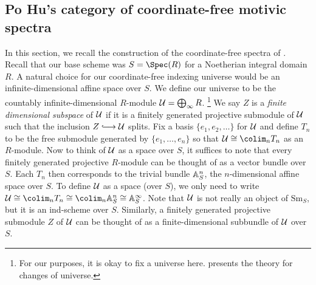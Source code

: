 \documentclass{amsart}
\theoremstyle{definition}
\begin{document}
\subsection{Po Hu's category of coordinate-free motivic spectra}\label{sec:coordfree}
In this section, we recall the construction of the coordinate-free spectra of \cite{Hu03}. Recall that our base scheme was $S = \Spec(R)$ for a Noetherian integral domain $R$. A natural choice for our coordinate-free indexing universe would be an infinite-dimensional affine space over $S$. We define our universe to be the countably infinite-dimensional $R$-module ${\mathcal{U}} = \bigoplus_{\infty} R$. \footnote{For our purposes, it is okay to fix a universe here. \cite[Chapter 8]{Hu03} presents the theory for changes of universe.} We say $Z$ is a \emph{finite dimensional subspace} of ${\mathcal{U}}$ if it is a finitely generated projective submodule of ${\mathcal{U}}$ such that the inclusion $Z \monoto \oU$ splits. Fix a basis $\{e_1, e_2, \dots\}$ for ${\mathcal{U}}$ and define $T_n$ to be the free submodule generated by $\{e_1, \dots, e_n\}$ so that $\oU \iso \colim_n T_n$ as an $R$-module. Now to think of ${\mathcal{U}}$ as a space over $S$, it suffices to note that every finitely generated projective $R$-module can be thought of as a vector bundle over $S$. Each $T_n$ then corresponds to the trivial bundle $\mathbb{A}^n_S$, the $n$-dimensional affine space over $S$. To define ${\mathcal{U}}$ as a space (over $S$), we only need to write $\oU \iso \colim_n T_n \iso \colim_n \bA^n_S \iso \bA^{\infty}_S$. Note that ${\mathcal{U}}$ is not really an object of $\mathrm{Sm}_S$, but it is an ind-scheme over $S$. Similarly, a finitely generated projective submodule $Z$ of ${\mathcal{U}}$ can be thought of as a finite-dimensional subbundle of ${\mathcal{U}}$ over $S$.\\
\end{document}
